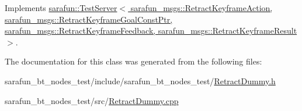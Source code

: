 Implements \hyperlink{classsarafun_1_1TestServer_a85b9721105c2a4b46bae26428433513e}{sarafun\-::\-Test\-Server$<$ sarafun\-\_\-msgs\-::\-Retract\-Keyframe\-Action, sarafun\-\_\-msgs\-::\-Retract\-Keyframe\-Goal\-Const\-Ptr, sarafun\-\_\-msgs\-::\-Retract\-Keyframe\-Feedback, sarafun\-\_\-msgs\-::\-Retract\-Keyframe\-Result $>$}.



The documentation for this class was generated from the following files\-:\begin{DoxyCompactItemize}
\item 
sarafun\-\_\-bt\-\_\-nodes\-\_\-test/include/sarafun\-\_\-bt\-\_\-nodes\-\_\-test/\hyperlink{RetractDummy_8h}{Retract\-Dummy.\-h}\item 
sarafun\-\_\-bt\-\_\-nodes\-\_\-test/src/\hyperlink{RetractDummy_8cpp}{Retract\-Dummy.\-cpp}\end{DoxyCompactItemize}
